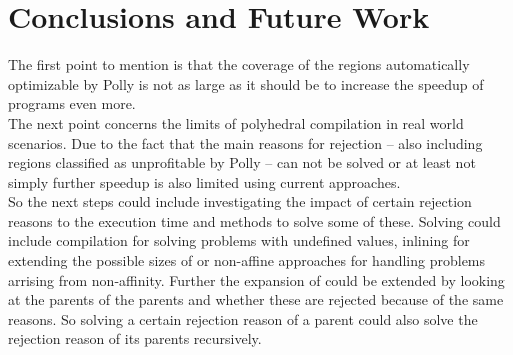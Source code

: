 \chapter{Conclusions and Future Work}
The first point to mention is that the coverage of the regions automatically optimizable by Polly is not as large as it should be to increase the speedup of programs even more.\\
The next point concerns the limits of polyhedral compilation in real world scenarios.
Due to the fact that the main reasons for rejection -- also including regions classified as unprofitable by Polly -- can not be solved or at least not simply further speedup is also limited using current approaches.\\
So the next steps could include investigating the impact of certain rejection reasons to the execution time and methods to solve some of these.
Solving could include \jit compilation for solving problems with undefined values, inlining for extending the possible sizes of \scops or non-affine approaches for handling problems arrising from non-affinity.
Further the expansion of \scops could be extended by looking at the parents of the parents and whether these are rejected because of the same reasons.
So solving a certain rejection reason of a parent could also solve the rejection reason of its parents recursively.
